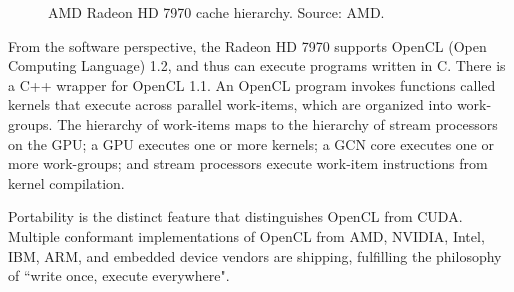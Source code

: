 \begin{figure}
\centering
\caption{AMD Radeon HD 7970 cache hierarchy. Source: AMD.}
\label{GPU:RadeonHD7970CacheHierarchy}
\end{figure}

From the software perspective, the Radeon HD 7970 supports OpenCL (Open Computing Language) 1.2, and thus can execute programs written in C. There is a C++ wrapper for OpenCL 1.1. An OpenCL program invokes functions called kernels that execute across parallel work-items, which are organized into work-groups. The hierarchy of work-items maps to the hierarchy of stream processors on the GPU; a GPU executes one or more kernels; a GCN core executes one or more work-groups; and stream processors execute work-item instructions from kernel compilation.

Portability is the distinct feature that distinguishes OpenCL from CUDA. Multiple conformant implementations of OpenCL from AMD, NVIDIA, Intel, IBM, ARM, and embedded device vendors are shipping, fulfilling the philosophy of ``write once, execute everywhere".

\chapterend
